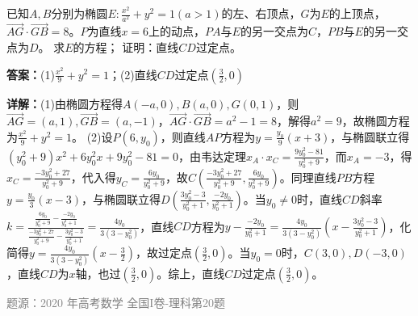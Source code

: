 \begin{question}
已知$A,B$分别为椭圆$E:\frac{x^2}{a^2}+y^2=1(a>1)$的左、右顶点，$G$为$E$的上顶点，$\overrightarrow{AG}\cdot\overrightarrow{GB}=8$。$P$为直线$x=6$上的动点，$PA$与$E$的另一交点为$C$，$PB$与$E$的另一交点为$D$。
求$E$的方程；
证明：直线$CD$过定点。
\begin{solution}
\textbf{答案：}(1)$\frac{x^2}{9}+y^2=1$；(2)直线$CD$过定点$\left(\frac{3}{2},0\right)$

\textbf{详解：}(1)由椭圆方程得$A(-a,0),B(a,0),G(0,1)$，则$\overrightarrow{AG}=(a,1),\overrightarrow{GB}=(a,-1)$，$\overrightarrow{AG}\cdot\overrightarrow{GB}=a^2-1=8$，解得$a^2=9$，故椭圆方程为$\frac{x^2}{9}+y^2=1$。
(2)设$P(6,y_0)$，则直线$AP$方程为$y=\frac{y_0}{9}(x+3)$，与椭圆联立得$(y_0^2+9)x^2+6y_0^2x+9y_0^2-81=0$，由韦达定理$x_A\cdot x_C=\frac{9y_0^2-81}{y_0^2+9}$，而$x_A=-3$，得$x_C=\frac{-3y_0^2+27}{y_0^2+9}$，代入得$y_C=\frac{6y_0}{y_0^2+9}$，故$C\left(\frac{-3y_0^2+27}{y_0^2+9},\frac{6y_0}{y_0^2+9}\right)$。同理直线$PB$方程$y=\frac{y_0}{3}(x-3)$，与椭圆联立得$D\left(\frac{3y_0^2-3}{y_0^2+1},\frac{-2y_0}{y_0^2+1}\right)$。当$y_0\neq0$时，直线$CD$斜率$k=\frac{\frac{6y_0}{y_0^2+9}-\frac{-2y_0}{y_0^2+1}}{\frac{-3y_0^2+27}{y_0^2+9}-\frac{3y_0^2-3}{y_0^2+1}}=\frac{4y_0}{3(3-y_0^2)}$，直线$CD$方程为$y-\frac{-2y_0}{y_0^2+1}=\frac{4y_0}{3(3-y_0^2)}\left(x-\frac{3y_0^2-3}{y_0^2+1}\right)$，化简得$y=\frac{4y_0}{3(3-y_0^2)}\left(x-\frac{3}{2}\right)$，故过定点$\left(\frac{3}{2},0\right)$。当$y_0=0$时，$C(3,0),D(-3,0)$，直线$CD$为$x$轴，也过$\left(\frac{3}{2},0\right)$。综上，直线$CD$过定点$\left(\frac{3}{2},0\right)$。

\textcolor{gray}{\footnotesize 题源：2020 年高考数学 全国I卷-理科第20题}
\end{solution}
\end{question}


